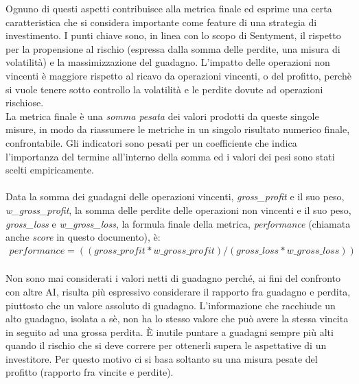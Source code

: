 \documentclass[a4paper,12pt]{report}
\begin{document}
Ognuno di questi aspetti contribuisce alla metrica finale ed esprime una certa caratteristica che si considera importante come feature di una strategia di investimento. I punti chiave sono, in linea con lo scopo di Sentyment, il rispetto per la propensione al rischio (espressa dalla somma delle perdite, una misura di volatilità) e la massimizzazione del guadagno. L'impatto delle operazioni non vincenti è maggiore rispetto al ricavo da operazioni vincenti, o del profitto, perchè si vuole tenere sotto controllo la volatilità e le perdite dovute ad operazioni rischiose.\\ La metrica finale è una \textit{somma pesata} dei valori prodotti da queste singole misure, in modo da riassumere le metriche in un singolo risultato numerico finale, confrontabile. Gli indicatori sono pesati per un coefficiente che indica l'importanza del termine all'interno della somma ed i valori dei pesi sono stati scelti empiricamente.\\~\\Data la somma dei guadagni delle operazioni vincenti, \textit{gross\_profit} e il suo peso, \textit{w\_gross\_profit}, la somma delle perdite delle operazioni non vincenti e il suo peso, \textit{gross\_loss} e \textit{w\_gross\_loss}, la formula finale della metrica, \textit{performance} (chiamata anche \textit{score} in questo documento), è:
\begin{equation}
\begin{split}
performance=((gross\_profit*w\_gross\_profit)/(gross\_loss*w\_gross\_loss))
\end{split}
\end{equation} 
\\Non sono mai considerati i valori netti di guadagno perché, ai fini del confronto con altre AI, risulta più espressivo considerare il rapporto fra guadagno e perdita, piuttosto che un valore assoluto di guadagno. L'informazione che racchiude un alto guadagno, isolata a sè, non ha lo stesso valore che può avere la stessa vincita in seguito ad una grossa perdita. È inutile puntare a guadagni sempre più alti quando il rischio che si deve correre per ottenerli supera le aspettative di un investitore. Per questo motivo ci si basa soltanto su una misura pesate del profitto (rapporto fra vincite e perdite).\\~\\
\end{document}
